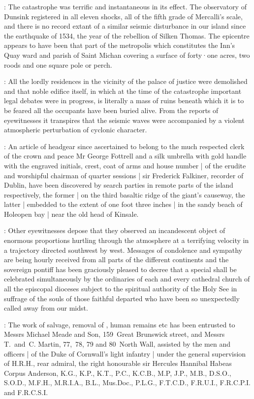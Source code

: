 :
The catastrophe was terrific and instantaneous in its effect.
The observatory of Dunsink registered in all eleven shocks,
all of the fifth grade of Mercalli's scale,
and there is no record extant of a similar
seismic disturbance in our island since the earthquake of 1534,
the year of the rebellion of Silken Thomas.
The epicentre appears to have
been that part of the metropolis which constitutes the Inn's Quay
ward and parish of Saint Michan covering a surface of forty·one acres,
two roods and one square pole or perch.

:
All the lordly residences in
the vicinity of the palace of justice were demolished and that noble
edifice itself,
in which at the time of the catastrophe important
legal debates were in progress,
is literally a mass of ruins beneath
which it is to be feared all the occupants have been buried alive.
From the reports of eyewitnesses it transpires that the seismic waves
were accompanied
by a violent atmospheric perturbation of cyclonic character.

:
An article of headgear since ascertained to belong to the much
respected clerk of the crown and peace Mr George Fottrell and a silk
umbrella with gold handle with the engraved initials,
crest,
coat of arms
and house number |
of the erudite and worshipful chairman of quarter sessions |
sir Frederick Falkiner,
recorder of Dublin,
have been discovered by search parties in remote parts of the island respectively,
the former |
on the third basaltic ridge of the giant's causeway,
the latter |
embedded to the extent of one foot three inches |
in the sandy beach of Holeopen bay |
near the old head of Kinsale.

:
Other eyewitnesses depose that they observed an incandescent object of enormous proportions
hurtling through
the atmosphere at a terrifying velocity in a trajectory directed southwest by west.
Messages of condolence and sympathy are being
hourly received from all parts of the different continents and the
sovereign pontiff has been graciously pleased to decree that a
special 
shall be celebrated simultaneously by
the ordinaries of each and every cathedral church of all the episcopal
dioceses subject to the spiritual authority of the Holy See in suffrage of
the souls of those faithful departed who have been so unexpectedly called
away from our midst.

:
The work of salvage,
removal of ,
human remains etc has been entrusted to Messrs Michael Meade and Son,
159~Great Brunswick street,
and Messrs T.~and~C. Martin,
77,~78, 79 and 80~North Wall,
assisted by the men and officers |
of the Duke of Cornwall's light infantry |
under the general supervision of H.R.H.,
rear admiral,
the right honourable sir Hercules Hannibal Habeas Corpus Anderson,
K.G.,
K.P.,
K.T.,
P.C.,
K.C.B.,
M.P,
J.P.,
M.B.,
D.S.O.,
S.O.D.,
M.F.H.,
M.R.I.A.,
B.L.,
Mus.Doc.,
P.L.G.,
F.T.C.D.,
F.R.U.I.,
F.R.C.P.I.
and F.R.C.S.I.

